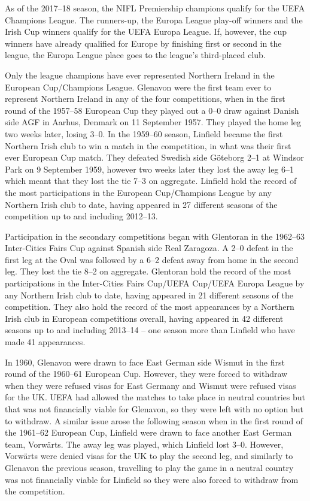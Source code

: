 As of the 2017--18 season, the NIFL Premiership champions qualify for
the UEFA Champions League. The runners-up, the Europa League play-off
winners and the Irish Cup winners qualify for the UEFA Europa League.
If, however, the cup winners have already qualified for Europe by
finishing first or second in the league, the Europa League place goes to
the league's third-placed club.

Only the league champions have ever represented Northern Ireland in the
European Cup/Champions League. Glenavon were the first team ever to
represent Northern Ireland in any of the four competitions, when in the
first round of the 1957--58 European Cup they played out a 0--0 draw
against Danish side AGF in Aarhus, Denmark on 11 September 1957. They
played the home leg two weeks later, losing 3--0. In the 1959--60
season, Linfield became the first Northern Irish club to win a match in
the competition, in what was their first ever European Cup match. They
defeated Swedish side Göteborg 2--1 at Windsor Park on 9 September 1959,
however two weeks later they lost the away leg 6--1 which meant that
they lost the tie 7--3 on aggregate. Linfield hold the record of the
most participations in the European Cup/Champions League by any Northern
Irish club to date, having appeared in 27 different seasons of the
competition up to and including 2012--13.

Participation in the secondary competitions began with Glentoran in the
1962--63 Inter-Cities Fairs Cup against Spanish side Real Zaragoza. A
2--0 defeat in the first leg at the Oval was followed by a 6--2 defeat
away from home in the second leg. They lost the tie 8--2 on aggregate.
Glentoran hold the record of the most participations in the Inter-Cities
Fairs Cup/UEFA Cup/UEFA Europa League by any Northern Irish club to
date, having appeared in 21 different seasons of the competition. They
also hold the record of the most appearances by a Northern Irish club in
European competitions overall, having appeared in 42 different seasons
up to and including 2013--14 -- one season more than Linfield who have
made 41 appearances.

In 1960, Glenavon were drawn to face East German side Wismut in the
first round of the 1960--61 European Cup. However, they were forced to
withdraw when they were refused visas for East Germany and Wismut were
refused visas for the UK. UEFA had allowed the matches to take place in
neutral countries but that was not financially viable for Glenavon, so
they were left with no option but to withdraw. A similar issue arose the
following season when in the first round of the 1961--62 European Cup,
Linfield were drawn to face another East German team, Vorwärts. The away
leg was played, which Linfield lost 3--0. However, Vorwärts were denied
visas for the UK to play the second leg, and similarly to Glenavon the
previous season, travelling to play the game in a neutral country was
not financially viable for Linfield so they were also forced to withdraw
from the competition.


